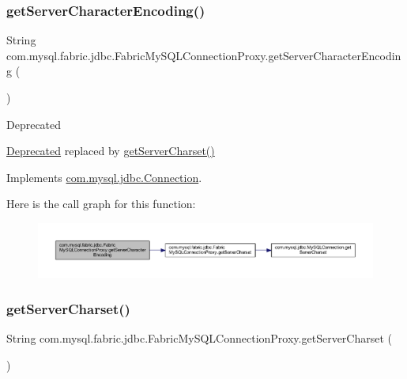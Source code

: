 \subsubsection{\texorpdfstring{get\+Server\+Character\+Encoding()}{getServerCharacterEncoding()}}
{\footnotesize\ttfamily String com.\+mysql.\+fabric.\+jdbc.\+Fabric\+My\+S\+Q\+L\+Connection\+Proxy.\+get\+Server\+Character\+Encoding (\begin{DoxyParamCaption}{ }\end{DoxyParamCaption})}

\begin{DoxyRefDesc}{Deprecated}
\item[\mbox{\hyperlink{deprecated__deprecated000002}{Deprecated}}]replaced by {\ttfamily \mbox{\hyperlink{classcom_1_1mysql_1_1fabric_1_1jdbc_1_1_fabric_my_s_q_l_connection_proxy_a05da3e56f23e090e7a4048dcd59d1454}{get\+Server\+Charset()}}} \end{DoxyRefDesc}


Implements \mbox{\hyperlink{interfacecom_1_1mysql_1_1jdbc_1_1_connection_ab6e0170645e189b8622642705f7cc3a4}{com.\+mysql.\+jdbc.\+Connection}}.

Here is the call graph for this function\+:\nopagebreak
\begin{figure}[H]
\begin{center}
\leavevmode
\includegraphics[width=350pt]{classcom_1_1mysql_1_1fabric_1_1jdbc_1_1_fabric_my_s_q_l_connection_proxy_abe3b0eb675021f5d0ab5aaf069bf0a58_cgraph}
\end{center}
\end{figure}
\mbox{\label{classcom_1_1mysql_1_1fabric_1_1jdbc_1_1_fabric_my_s_q_l_connection_proxy_a05da3e56f23e090e7a4048dcd59d1454}} 
\subsubsection{\texorpdfstring{get\+Server\+Charset()}{getServerCharset()}}
{\footnotesize\ttfamily String com.\+mysql.\+fabric.\+jdbc.\+Fabric\+My\+S\+Q\+L\+Connection\+Proxy.\+get\+Server\+Charset (\begin{DoxyParamCaption}{ }\end{DoxyParamCaption})}

